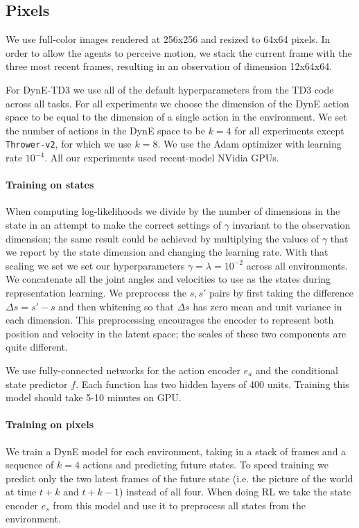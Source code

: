 \begin{subappendices}
\subsection{Pixels}
We use full-color images rendered at 256x256 and resized to 64x64 pixels.
In order to allow the agents to perceive motion, we stack the current frame with the three most recent frames, resulting in an observation of dimension 12x64x64.


 \label{sec:hyperparams}

For DynE-TD3 we use all of the default hyperparameters from the TD3 code across all tasks.
For all experiments we choose the dimension of the DynE action space to be equal to the dimension of a single action in the environment.
We set the number of actions in the DynE space to be $k=4$ for all experiments except \texttt{Thrower-v2}, for which we use $k=8$.
We use the Adam optimizer \citep{kingma2014adam} with learning rate $10^{-4}$.
All our experiments used recent-model NVidia GPUs.


\paragraph{Training on states}
When computing log-likelihoods we divide by the number of dimensions in the state in an attempt to make the correct settings of $\gamma$ invariant to the observation dimension; the same result could be achieved by multiplying the values of $\gamma$ that we report by the state dimension and changing the learning rate.
With that scaling we set we set our hyperparameters $\gamma = \lambda = 10^{-2}$ across all environments.
We concatenate all the joint angles and velocities to use as the states during representation learning.
We preprocess the $s, s'$ pairs by first taking the difference $\Delta s = s' - s$ and then whitening so that $\Delta s$ has zero mean and unit variance in each dimension.
This preprocessing encourages the encoder to represent both position and velocity in the latent space; the scales of these two components are quite different.

We use fully-connected networks for the action encoder $e_a$ and the conditional state predictor $f$. Each function has two hidden layers of 400 units.
Training this model should take 5-10 minutes on GPU.


\paragraph{Training on pixels}
We train a DynE model for each environment, taking in a stack of frames and a sequence of $k=4$ actions and predicting future states.
To speed training we predict only the two latest frames of the future state (i.e. the picture of the world at time $t+k$ and $t+k-1$) instead of all four.
When doing RL we take the state encoder $e_s$ from this model and use it to preprocess all states from the environment.


\end{subappendices}
